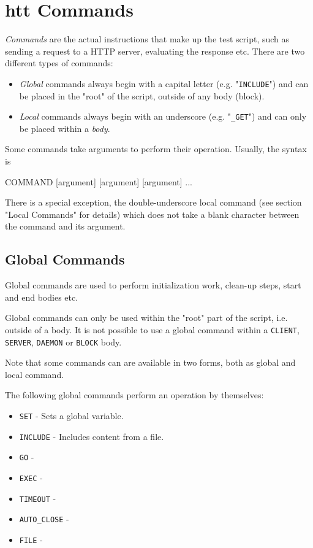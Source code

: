 \chapter{htt Commands}
\label{chap:commands}

\textit{Commands} are the actual instructions that make up the test script, such as 
sending a request to a HTTP server, evaluating the response etc. There are two 
different types of commands:

\begin{itemize}
\item \textit{Global} commands always begin with a capital letter (e.g. "\texttt{INCLUDE}") and 
      can be placed in the "root" of the script, outside of any body (block).
\item \textit{Local} commands always begin with an underscore (e.g. "\texttt{\_GET}") and 
      can only be placed within a \textit{body}.
\end{itemize}

Some commands take arguments to perform their operation. Usually, the syntax is

\begin{usplisting}
    COMMAND [argument] [argument] [argument] ...
\end{usplisting}

There is a special exception, the double-underscore local command (see section 
"Local Commands" for details) which does not take a blank character between the 
command and its argument.


\newpage
\section{Global Commands}

Global commands are used to perform initialization work, clean-up steps, 
start and end bodies etc.

Global commands can only be used within the "root" part of the script, 
i.e. outside of a body. It is not possible to use a global command within 
a \texttt{CLIENT}, \texttt{SERVER}, \texttt{DAEMON} or \texttt{BLOCK} body. 

Note that some commands can are available in two forms, both as global 
and local command.

The following global commands perform an operation by themselves:

\begin{itemize}
\item \texttt{SET} - Sets a global variable.
\item \texttt{INCLUDE} - Includes content from a file.
\item \texttt{GO} - 
\item \texttt{EXEC} - 
\item \texttt{TIMEOUT} - 
\item \texttt{AUTO\_CLOSE} - 
\item \texttt{FILE} - 
\end{itemize}

